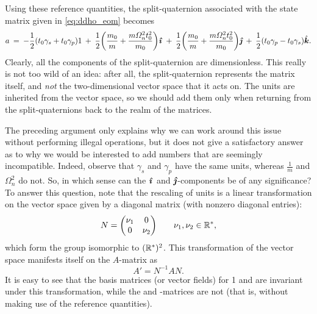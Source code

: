 Using these reference quantities, the split-quaternion associated with the state matrix given in \cref{eq:ddho_eom} becomes
\begin{equation}
    a\:=\: -\frac{1}{2}\qty(t_0\gamma_s + t_0\gamma_p)1\:+\:\frac{1}{2}\qty(\frac{m_0}{m} + \frac{m\Omega_n^2 t_0^2}{m_0})\quati\:+\:\frac{1}{2}\qty(\frac{m_0}{m} + \frac{m\Omega_n^2 t_0^2}{m_0})\quatj\:+\:\frac{1}{2}\qty(t_0\gamma_p - t_0\gamma_s)\quatk. 
    \label{eq:ddho_quat_units}
\end{equation}
Clearly, all the components of the split-quaternion are dimensionless. This really is not too wild of an idea: after all, the split-quaternion represents the matrix itself, and \emph{not} the two-dimensional vector space that it acts on. The units are inherited from the vector space, so we should add them only when returning from the split-quaternions back to the realm of the matrices. 

The preceding argument only explains why we can work around this issue without performing illegal operations, but it does not give a satisfactory answer as to why we would be interested to add numbers that are seemingly incompatible. Indeed, observe that \(\gamma_s\) and \(\gamma_p\) have the same units, whereas \(\tfrac{1}{m}\) and \(\Omega_n^2\) do not. So, in which sense can the \(\quati\) and \(\quatj\)-components be of any significance? To answer this question, note that the rescaling of units is a linear transformation on the vector space given by a diagonal matrix (with nonzero diagonal entries): 
\begin{equation}
     N = \mqty(\dmat[0]{\nu_1}{\nu_2}) \qquad \nu_1, \nu_2 \in \real^*,
\end{equation}
which form the group isomorphic to \((\real^*)^2\). This transformation of the vector space manifests itself on the \(A\)-matrix as 
\begin{equation} 
    A' = N^{-1}A N.
\end{equation}
It is easy to see that the basis matrices (or vector fields) for 1 and \quatk are invariant under this transformation, while the \quati and \quatj-matrices are not (that is, without making use of the reference quantities). 

